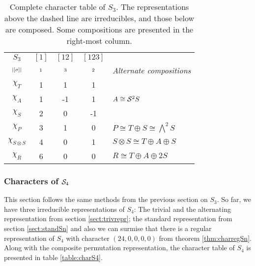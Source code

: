 \begin{table}[hbt!]
	\centering
	
	\begin{tabular}{c | c c c | l}
		$S_3$         & $[1]$   & $[12]$  & $[123]$ &                                          \\
		$\scriptstyle|[\sigma]|$    & $\scriptstyle 1$ & $\scriptstyle 3$ & $\scriptstyle 2$ &  \textit{Alternate compositions}         \\ \hline
		$\chi_T$       & 1       & 1       & 1       &                                          \\
		$\chi_A$       & 1       & -1      & 1       & $ A \cong \mathcal{S}^2S$                       \\
		$\chi_S$       & 2       & 0       & -1      &                                          \\ \hline\hline
		$\chi_P$       & 3       & 1       & 0       & $ P \cong T \oplus S \cong \bigwedge^2S$ \\
		$\chi_{S \otimes S}$ & 4       & 0       & 1       & $ S \otimes S \cong T \oplus A \oplus S$ \\
		$\chi_R$       & 6       & 0       & 0       & $ R \cong T \oplus A \oplus 2S$
	\end{tabular}
	\caption{Complete character table of $S_3$. The representations above the dashed line are irreducibles, and those below are composed. Some compositions are presented in the right-most column.}
\end{table}

\subsubsection{Characters of $\mathcal{S}_4$}

This section follows the same methods from the previous section on $S_3$. So far, we have three irreducible representations of $S_4$: The trivial and the alternating representation from section \ref{sect:trivrepr}; the standard representation from section \ref{sect:standSn} and also we can surmise that there is a regular representation of $S_4$ with character $(24,0,0,0,0)$ from theorem \ref{thm:charregSn}. Along with the composite permutation representation, the character table of $S_4$ is presented in table \ref{table:charS4}. 

